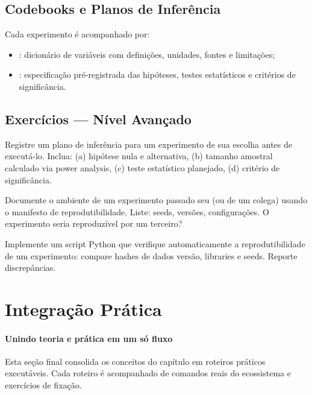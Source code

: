 \subsection{Codebooks e Planos de Inferência}

Cada experimento é acompanhado por:
\begin{itemize}
\item {}: dicionário de variáveis com definições,
unidades, fontes e limitações;
\item {}: especificação pré-registrada
das hipóteses, testes estatísticos e critérios de significância.
\end{itemize}

\subsection{Exercícios — Nível Avançado}

\begin{exercicio}
Registre um plano de inferência para um experimento de sua escolha
antes de executá-lo. Inclua: (a) hipótese nula e alternativa,
(b) tamanho amostral calculado via power analysis, (c) teste
estatístico planejado, (d) critério de significância.
\end{exercicio}

\begin{exercicio}
Documente o ambiente de um experimento passado seu (ou de um colega)
usando o manifesto de reprodutibilidade. Liste: seeds, versões,
configurações. O experimento seria reproduzível por um terceiro?
\end{exercicio}

\begin{exercicio}
Implemente um script Python que verifique automaticamente a
reprodutibilidade de um experimento: compare hashes de dados
versão, libraries e seeds. Reporte discrepâncias.
\end{exercicio}

\section{Integração Prática}
\label{sec:integracao-pratica}

\paragraph{Unindo teoria e prática em um só fluxo} Esta seção final consolida os conceitos do capítulo em roteiros
práticos executáveis. Cada roteiro é acompanhado de comandos
reais do ecossistema e exercícios de fixação.

